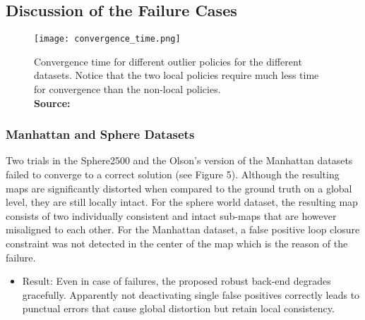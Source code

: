 \documentclass[9pt,technote]{IEEEtran}
\newcommand*{\captionsource}[2]{%
  \caption[{#1}]{%
    #1%
    \\\hspace{\linewidth}%
    \textbf{Source:} #2%
  }%
}
\begin{document}
\subsection{Discussion of the Failure Cases}
\begin{figure}
[h!]
\centering
\texttt{[image: convergence\_time.png]}
\captionsource{Convergence time for different outlier policies for the different datasets.  Notice that the two local policies require much less time for convergence than the non-local policies.}{\cite{sunderhauf2012switchable}}
\end{figure}
\subsubsection{Manhattan and Sphere Datasets}

Two trials in the Sphere2500 and the Olson’s version of the Manhattan datasets failed to converge to a correct solution (see Figure 5). Although the resulting maps are significantly distorted when compared to the ground truth on a global level, they are still locally intact.
For the sphere world dataset, the resulting map consists of two individually consistent and intact sub-maps that are however misaligned to each other.
For the Manhattan dataset, a false positive loop closure constraint was not detected in the center of the map which is the reason of the failure. 
\begin{itemize}
\item Result: Even in case of failures, the proposed robust back-end degrades gracefully. Apparently not deactivating single false positives correctly leads to punctual  errors  that  cause  global distortion but retain local consistency.
\end{itemize}
\end{document}
